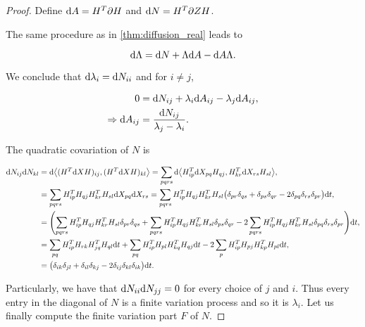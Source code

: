 \begin{proof}

Define $\mathrm d A = H^T\partial H$ and $\mathrm d N = H^T \partial Z H$.


The same procedure as in \ref{thm:diffusion_real} leads to 

\begin{equation*}
    \mathrm d \Lambda = \mathrm d N + \Lambda \mathrm d A - \mathrm d A \Lambda.
\end{equation*}

We conclude that $\mathrm d \lambda_i = \mathrm d N_{ii}$ and for $i\neq j$, 

\begin{align*}
    0 &= \mathrm d N_{ij} + \lambda_i \mathrm d A_{ij} - \lambda_j \mathrm d A_{ij},\\
    \Rightarrow \mathrm d A_{ij} &= \frac{\mathrm d N_{ij}}{\lambda_j - \lambda_i}.
\end{align*}

The quadratic covariation of $N$ is

\begin{align*}
    \mathrm d N_{ij}\mathrm d N_{kl} &= \mathrm d \bigl< (H^T \mathrm d X H)_{ij}, (H^T\mathrm d X H)_{kl} \bigr> = \sum_{pqrs} \mathrm d \bigl< H^T_{ip} \mathrm d X_{pq} H_{qj}, H^T_{kr}\mathrm d X_{rs} H_{sl} \bigr>,\\
    &= \sum_{pqrs} H^T_{ip}  H_{qj}H^T_{kr} H_{sl} \mathrm d X_{pq}\mathrm d X_{rs} = \sum_{pqrs} H^T_{ip}  H_{qj}H^T_{kr} H_{sl}\bigl( \delta_{pr}\delta_{qs} + \delta_{ps}\delta_{qr} - 2 \delta_{pq}\delta_{rs}\delta_{pr} \bigr)\mathrm d t,\\
    &= \Biggl(\sum_{pqrs}H^T_{ip}  H_{qj}H^T_{kr} H_{sl}\delta_{pr}\delta_{qs} + \sum_{pqrs}H^T_{ip}  H_{qj}H^T_{kr} H_{sl}\delta_{ps}\delta_{qr} - 2 \sum_{pqrs}H^T_{ip}  H_{qj}H^T_{kr} H_{sl}\delta_{pq}\delta_{rs}\delta_{pr}\Biggr) \mathrm d t,\\
    &= \sum_{pq} H^T_{ip}H_{rk}H^T_{jq}H_{ql}\mathrm d t + \sum_{pq}H^T_{ip}H_{pl}H^T_{kq}H_{qj} \mathrm d t - 2 \sum_{p} H^T_{ip}H_{pj}H^T_{kp}H_{pl} \mathrm d t,\\
    &= \bigl(\delta_{ik}\delta_{jl} + \delta_{il}\delta_{kj} - 2\delta_{ij}\delta_{kl}\delta_{ik} \bigr)\mathrm d t.
\end{align*}

Particularly, we have that $\mathrm d N_{ii}\mathrm d N_{jj} = 0$ for every choice of $j$ and $i$. Thus every entry in the diagonal of $N$ is a finite variation process and so it is $\lambda_i$. Let us finally compute the finite variation part $F$ of $N$.


\end{proof}
